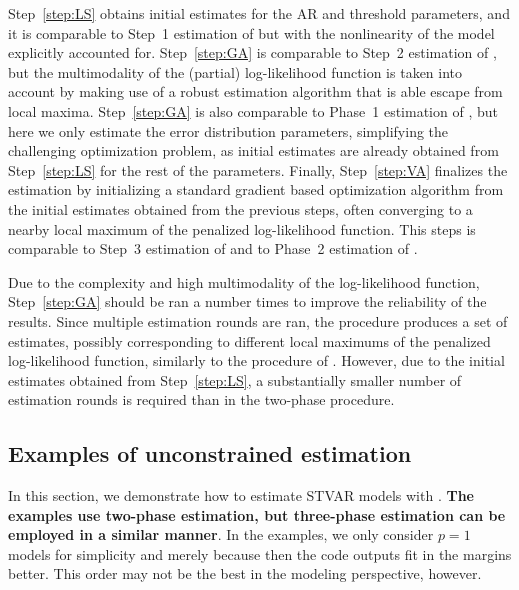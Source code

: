 \documentclass[nojss]{jss}
\begin{document}
Step~\ref{step:LS} obtains initial estimates for the AR and threshold parameters, and it is comparable to Step~1 estimation of \cite{Lanne+Meitz+Saikkonen:2017} but with the nonlinearity of the model explicitly accounted for. Step~\ref{step:GA} is comparable to Step~2 estimation of \cite{Lanne+Meitz+Saikkonen:2017}, but the multimodality of the (partial) log-likelihood function is taken into account by making use of a robust estimation algorithm that is able escape from local maxima. Step~\ref{step:GA} is also comparable to Phase~1 estimation of \cite{Virolainen2:2024}, but here we only estimate the error distribution parameters, simplifying the challenging optimization problem, as initial estimates are already obtained from Step~\ref{step:LS} for the rest of the parameters. Finally, Step~\ref{step:VA} finalizes the estimation by initializing a standard gradient based optimization algorithm from the initial estimates obtained from the previous steps, often converging to a nearby local maximum of the penalized log-likelihood function. This steps is comparable to Step~3 estimation of \cite{Lanne+Meitz+Saikkonen:2017} and to Phase~2 estimation of \cite{Virolainen2:2024}.

Due to the complexity and high multimodality of the log-likelihood function, Step~\ref{step:GA} should be ran a number times to improve the reliability of the results. Since multiple estimation rounds are ran, the procedure produces a set of estimates, possibly corresponding to different local maximums of the penalized log-likelihood function, similarly to the procedure of \cite{Virolainen2:2024}. However, due to the initial estimates obtained from Step~\ref{step:LS}, a substantially smaller number of estimation rounds is required than in the two-phase procedure.


\subsection{Examples of unconstrained estimation}\label{sec:example_estim}

In this section, we demonstrate how to estimate STVAR models with . \textbf{The examples use two-phase estimation, but three-phase estimation can be employed in a similar manner}. In the examples, we only consider $p=1$ models for simplicity and merely because then the code outputs fit in the margins better. This order may not be the best in the modeling perspective, however.
\end{document}
